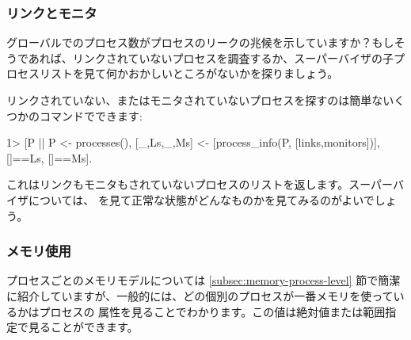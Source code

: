 \subsubsection{リンクとモニタ}

グローバルでのプロセス数がプロセスのリークの兆候を示していますか？もしそうであれば、リンクされていないプロセスを調査するか、スーパーバイザの子プロセスリストを見て何かおかしいところがないかを探りましょう。

リンクされていない、またはモニタされていないプロセスを探すのは簡単ないくつかのコマンドでできます:

\begin{VerbatimEshell}
1> [P || P <- processes(),
         [{_,Ls},{_,Ms}] <- [process_info(P, [links,monitors])],
         []==Ls, []==Ms].
\end{VerbatimEshell}

これはリンクもモニタもされていないプロセスのリストを返します。スーパーバイザについては、 を見て正常な状態がどんなものかを見てみるのがよいでしょう。

\subsubsection{メモリ使用}

プロセスごとのメモリモデルについては \ref{subsec:memory-process-level} 節で簡潔に紹介していますが、一般的には、どの個別のプロセスが一番メモリを使っているかはプロセスの  属性を見ることでわかります。この値は絶対値または範囲指定で見ることができます。

